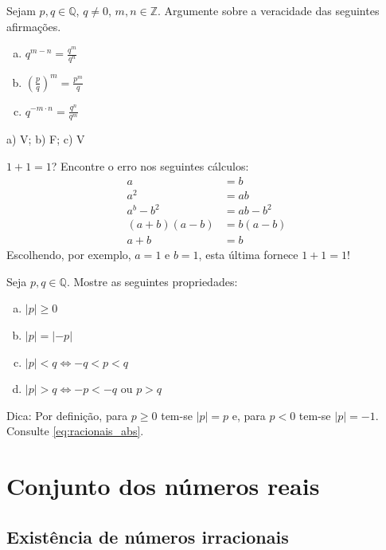 \begin{exer}
  Sejam $p,q\in\mathbb{Q}$, $q\neq 0$, $m,n\in\mathbb{Z}$. Argumente sobre a veracidade das seguintes afirmações.
  \begin{enumerate}[a)]
  \item $q^{m-n} = \frac{q^m}{q^n}$
  \item $\displaystyle \left(\frac{p}{q}\right)^m = \frac{p^m}{q}$
  \item $q^{-m\cdot n} = \frac{q^n}{q^m}$
  \end{enumerate}
\end{exer}
\begin{resp}
  a) V; b) F; c) V
\end{resp}

\begin{exer}
  $1+1 = 1$? Encontre o erro nos seguintes cálculos:
  \begin{align}
    a &= b\\
    a^2 &= ab\\
    a^b - b^2 &= ab - b^2\\
    (a+b)(a-b) &= b(a-b)\\
    a+b &= b
  \end{align}
  Escolhendo, por exemplo, $a=1$ e $b=1$, esta última fornece $1+1 = 1$!
\end{exer}

\begin{exer}
  Seja $p,q\in\mathbb{Q}$. Mostre as seguintes propriedades:
  \begin{enumerate}[a)]
  \item $|p|\geq 0$
  \item $|p| = |-p|$
  \item $|p|<q\Leftrightarrow -q<p<q$
  \item $|p|>q\Leftrightarrow -p<-q\text{ ou }p>q$
  \end{enumerate}
\end{exer}
\begin{resp}
  Dica: Por definição, para $p\geq 0$ tem-se $|p|=p$ e, para $p<0$ tem-se $|p|=-1$. Consulte \eqref{eq:racionais_abs}.
\end{resp}

\section{Conjunto dos números reais}\label{cap_numreal_sec_numreal}

\subsection{Existência de números irracionais}

